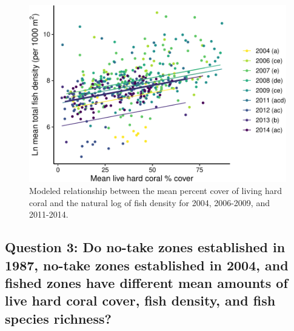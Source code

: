 \documentclass[12pt,]{article}
\begin{document}
\begin{figure}

\includegraphics{Mullaney_ENV872_Project_files/figure-latex/Fish Density Plot-1} \hfill{}

\caption{Modeled relationship between the mean percent cover of living hard coral and the natural log of fish density for 2004, 2006-2009, and 2011-2014.}\label{fig:Fish Density Plot}
\end{figure}

\hypertarget{question-3-do-no-take-zones-established-in-1987-no-take-zones-established-in-2004-and-fished-zones-have-different-mean-amounts-of-live-hard-coral-cover-fish-density-and-fish-species-richness}{%
\subsection{Question 3: Do no-take zones established in 1987, no-take
zones established in 2004, and fished zones have different mean amounts
of live hard coral cover, fish density, and fish species
richness?}\label{question-3-do-no-take-zones-established-in-1987-no-take-zones-established-in-2004-and-fished-zones-have-different-mean-amounts-of-live-hard-coral-cover-fish-density-and-fish-species-richness}}
\end{document}
